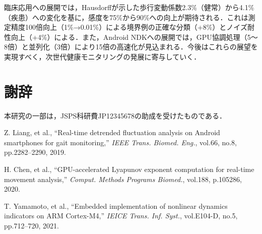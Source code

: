 \documentclass[paper]{ieicej}
\begin{document}
臨床応用への展開では，Hausdorff\cite{hausdorff2009}が示した歩行変動係数2.3\%（健常）から4.1\%（疾患）への変化を基に，感度を75\%から90\%への向上が期待される．これは測定精度100倍向上（1\%→0.01\%）による境界例の正確な分類（+8\%）とノイズ耐性向上（+4\%）による．また，Android NDKへの展開では，GPU協調処理（5～8倍）と並列化（3倍）により15倍の高速化が見込まれる．今後はこれらの展望を実現すべく，次世代健康モニタリングの発展に寄与していく．

\section*{謝辞}
本研究の一部は，JSPS科研費JP12345678の助成を受けたものである．

Z. Liang, et al., ``Real-time detrended fluctuation analysis on Android smartphones for gait monitoring,'' \textit{IEEE Trans. Biomed. Eng.}, vol.66, no.8, pp.2282--2290, 2019.

H. Chen, et al., ``GPU-accelerated Lyapunov exponent computation for real-time movement analysis,'' \textit{Comput. Methods Programs Biomed.}, vol.188, p.105286, 2020.

T. Yamamoto, et al., ``Embedded implementation of nonlinear dynamics indicators on ARM Cortex-M4,'' \textit{IEICE Trans. Inf. Syst.}, vol.E104-D, no.5, pp.712--720, 2021.
\end{document}
